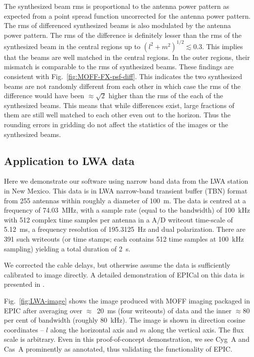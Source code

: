 \documentclass[a4paper,fleqn,usenatbib]{mnras}
\begin{document}
The synthesized beam rms is proportional to the antenna power pattern as expected from a point spread function uncorrected for the antenna power pattern. The rms of differenced synthesized beams is also modulated by the antenna power pattern. The rms of the difference is definitely lesser than the rms of the synthesized beam in the central regions up to $(l^2+m^2)^{1/2}\lesssim 0.3$. This implies that the beams are well matched in the central regions. In the outer regions, their mismatch is comparable to the rms of synthesized beams. These findings are consistent with Fig.~\ref{fig:MOFF-FX-psf-diff}. This indicates the two synthesized beams are not randomly different from each other in which case the rms of the difference would have been $\approx \sqrt{2}$ higher than the rms of the each of the synthesized beams. This means that while differences exist, large fractions of them are still well matched to each other even out to the horizon. Thus the rounding errors in gridding do not affect the statistics of the images or the synthesized beams.

\subsection{Application to LWA data}\label{sec:LWA-data}

Here we demonstrate our software using narrow band data from the LWA station in New Mexico. This data is in LWA narrow-band transient buffer (TBN) format from 255 antennas within roughly a diameter of 100~m. The data is centred at a frequency of 74.03~MHz, with a sample rate (equal to the bandwidth) of 100~kHz with 512 complex time samples per antenna in a A/D writeout time-scale of 5.12~ms, a frequency resolution of 195.3125~Hz and dual polarization. There are 391 such writeouts (or time stamps; each contains 512 time samples at 100~kHz sampling) yielding a total duration of 2~s. 

We corrected the cable delays, but otherwise assume the data is sufficiently calibrated to image directly. A detailed demonstration of EPICal on this data is presented in \citet{bea16}.

Fig.~\ref{fig:LWA-image} shows the image produced with MOFF imaging packaged in EPIC after averaging over $\approx$~20~ms (four writeouts) of data and the inner $\approx 80$ per cent of bandwidth (roughly 80~kHz). The image is shown in direction cosine coordinates -- $l$ along the horizontal axis and $m$ along the vertical axis. The flux scale is arbitrary. Even in this proof-of-concept demonstration, we see Cyg~A and Cas~A prominently as annotated, thus validating the functionality of EPIC.
\end{document}
